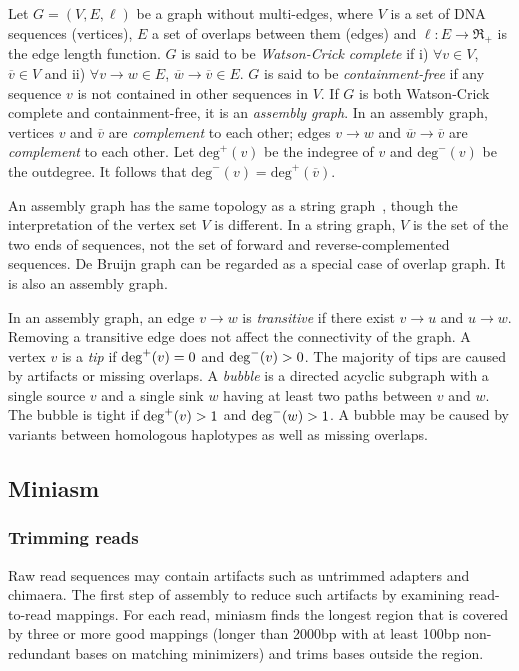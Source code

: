 \documentclass{bioinfo}
\begin{document}
\begin{methods}
Let $G=(V,E,\ell)$ be a graph without multi-edges, where $V$ is a
set of DNA sequences (vertices), $E$ a set of overlaps between them (edges) and
$\ell:E\to\Re_+$ is the edge length function. $G$ is said to be
\emph{Watson-Crick complete} if i) $\forall v\in V$, $\overline{v}\in V$ and
ii) $\forall v\to w\in E$, $\overline{w}\to\overline{v}\in E$. $G$ is said to
be \emph{containment-free} if any sequence $v$ is not contained in other
sequences in $V$. If $G$ is both Watson-Crick complete and containment-free, it
is an \emph{assembly graph}. In an assembly graph, vertices $v$ and
$\overline{v}$ are \emph{complement} to each other; edges $v\to w$ and
$\overline{w}\to\overline{v}$ are \emph{complement} to each other. Let
$\mathrm{deg}^+(v)$ be the indegree of $v$ and $\mathrm{deg}^-(v)$ be the
outdegree. It follows that $\mathrm{deg}^-(v)=\mathrm{deg}^+(\overline{v})$.

An assembly graph has the same topology as a string graph~\citep{Myers:2005bh},
though the interpretation of the vertex set $V$ is different. In a string
graph, $V$ is the set of the two ends of sequences, not the set of forward and
reverse-complemented sequences. De Bruijn graph can be regarded as a special
case of overlap graph. It is also an assembly graph.

In an assembly graph, an edge $v\to w$ is \emph{transitive} if there exist
$v\to u$ and $u\to w$. Removing a transitive edge does not affect the
connectivity of the graph. A vertex $v$ is a \emph{tip} if ${\rm deg}^+(v)=0$
and ${\rm deg}^-(v)>0$. The majority of tips are caused by artifacts or missing
overlaps. A \emph{bubble} is a directed acyclic subgraph with a single source
$v$ and a single sink $w$ having at least two paths between $v$ and $w$. The
bubble is tight if ${\rm deg}^+(v)>1$ and ${\rm deg}^-(w)>1$. A bubble may be
caused by variants between homologous haplotypes as well as missing overlaps.

\subsection{Miniasm}

\subsubsection{Trimming reads}

Raw read sequences may contain artifacts such as untrimmed adapters and
chimaera. The first step of assembly to reduce such artifacts by examining
read-to-read mappings. For each read, miniasm finds the longest region that is
covered by three or more good mappings (longer than 2000bp with at least 100bp
non-redundant bases on matching minimizers) and trims bases outside the region.


\end{methods}
\end{document}

